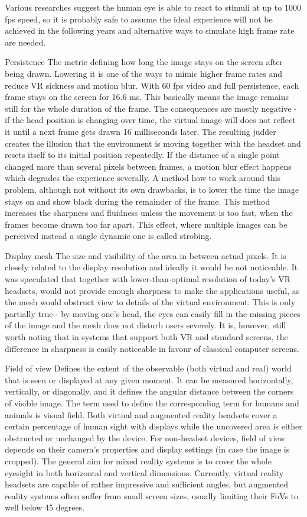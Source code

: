 \documentclass[12pt, a4paper]{article}
\newenvironment{definitions}
{\begin{description}[style=nextline]}
{\end{description}}
\begin{document}
\begin{definitions}
Various researches suggest the human eye is able to react to stimuli at up to 1000 fps speed, so it is probably safe to assume the ideal experience will not be achieved in the following years and alternative ways to simulate high frame rate are needed.
\item[Persistence] The metric defining how long the image stays on the screen after being drawn. Lowering it is one of the ways to mimic higher frame rates and reduce VR sickness and motion blur. With 60 fps video and full persistence, each frame stays on the screen for 16.6 ms. This basically means the image remains still for the whole duration of the frame. The consequences are mostly negative - if the head position is changing over time, the virtual image will does not reflect it until a next frame gets drawn 16 milliseconds later. The resulting judder creates the illusion that the environment is moving together with the headset and resets itself to its initial position repeatedly. If the distance of a single point changed more than several pixels between frames, a motion blur effect happens which degrades the experience severally. A method how to work around this problem, although not without its own drawbacks, is to lower the time the image stays on and show black during the remainder of the frame. This method increases the sharpness and fluidness unless the movement is too fast, when the frames become drawn too far apart. This effect, where multiple images can be perceived instead a single dynamic one is called strobing.
\item[Display mesh] The size and visibility of the area in between actual pixels. It is closely related to the display resolution and ideally it would be not noticeable. It was speculated that together with lower-than-optimal resolution of today’s VR headsets, would not provide enough sharpness to make the applications useful, as the mesh would obstruct view to details of the virtual environment. This is only partially true - by moving one’s head, the eyes can easily fill in the missing pieces of the image and the mesh does not disturb users severely. It is, however, still worth noting that in systems that support both VR and standard screens, the difference in sharpness is easily noticeable in favour of classical computer screens.
\item[Field of view] Defines the extent of the observable (both virtual and real) world that is seen or displayed at any given moment. It can be measured horizontally, vertically, or diagonally, and it defines the angular distance between the corners of visible image. The term used to define the corresponding term for humans and animals is visual field. Both virtual and augmented reality headsets cover a certain percentage of human sight with displays while the uncovered area is either obstructed or unchanged by the device. For non-headset devices, field of view depends on their camera’s properties and display settings (in case the image is cropped). The general aim for mixed reality systems is to cover the whole eyesight in both horizontal and vertical dimensions. Currently, virtual reality headsets are capable of rather impressive and sufficient angles, but augmented reality systems often suffer from small screen sizes, usually limiting their FoVs to well below 45 degrees.

\end{definitions}
\end{document}
